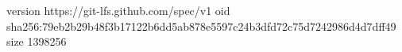 version https://git-lfs.github.com/spec/v1
oid sha256:79eb2b29b48f3b17122b6dd5ab878e5597c24b3dfd72c75d7242986d4d7dff49
size 1398256
